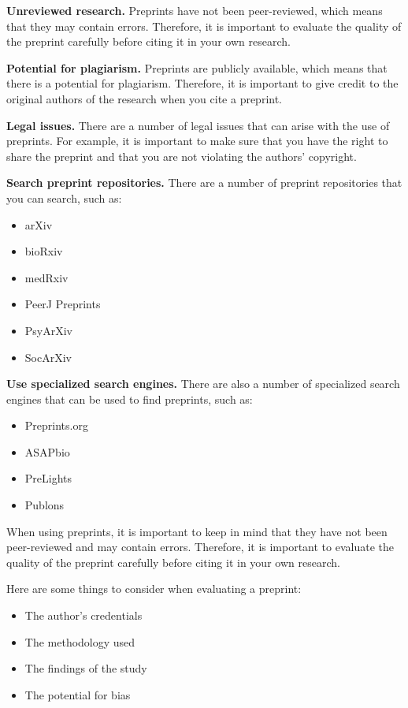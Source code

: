 \documentclass[
  b5paper]{book}
\begin{document}
\textbf{Unreviewed research.} Preprints have not been peer-reviewed, which means that they may contain errors. Therefore, it is important to evaluate the quality of the preprint carefully before citing it in your own research.

\textbf{Potential for plagiarism.} Preprints are publicly available, which means that there is a potential for plagiarism. Therefore, it is important to give credit to the original authors of the research when you cite a preprint.

\textbf{Legal issues.} There are a number of legal issues that can arise with the use of preprints. For example, it is important to make sure that you have the right to share the preprint and that you are not violating the authors' copyright.

\textbf{Search preprint repositories.} There are a number of preprint repositories that you can search, such as:

\begin{itemize}
\item
  arXiv
\item
  bioRxiv
\item
  medRxiv
\item
  PeerJ Preprints
\item
  PsyArXiv
\item
  SocArXiv
\end{itemize}

\textbf{Use specialized search engines.} There are also a number of specialized search engines that can be used to find preprints, such as:

\begin{itemize}
\item
  Preprints.org
\item
  ASAPbio
\item
  PreLights
\item
  Publons
\end{itemize}

When using preprints, it is important to keep in mind that they have not been peer-reviewed and may contain errors. Therefore, it is important to evaluate the quality of the preprint carefully before citing it in your own research.

Here are some things to consider when evaluating a preprint:

\begin{itemize}
\item
  The author's credentials
\item
  The methodology used
\item
  The findings of the study
\item
  The potential for bias
\end{itemize}
\end{document}
